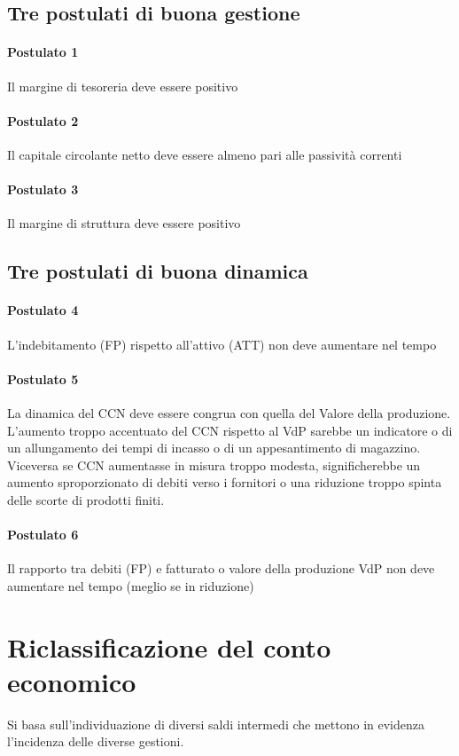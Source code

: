 \documentclass{report}
\begin{document}
	\subsection{Tre postulati di buona gestione}
	\paragraph{Postulato 1} Il margine di tesoreria deve essere positivo
	\paragraph{Postulato 2} Il capitale circolante netto deve essere almeno pari alle passività correnti
	\paragraph{Postulato 3} Il margine di struttura deve essere positivo
	\subsection{Tre postulati di buona dinamica}
	\paragraph{Postulato 4} L'indebitamento (FP) rispetto all'attivo (ATT) non deve aumentare nel tempo
	\paragraph{Postulato 5} La dinamica del CCN deve essere congrua con quella del Valore della produzione. L’aumento troppo accentuato del CCN rispetto al VdP sarebbe un indicatore o di un allungamento dei tempi di incasso o di un appesantimento di magazzino. Viceversa se CCN aumentasse in misura troppo modesta, significherebbe un aumento sproporzionato di debiti verso i fornitori o una riduzione troppo spinta delle scorte di prodotti finiti.
	\paragraph{Postulato 6} Il rapporto tra debiti (FP) e fatturato o valore della produzione VdP non deve aumentare nel tempo (meglio se in riduzione)
	
	\section{Riclassificazione del conto economico}
	Si basa sull'individuazione di diversi saldi intermedi che mettono in evidenza l'incidenza delle diverse gestioni.
\end{document}
